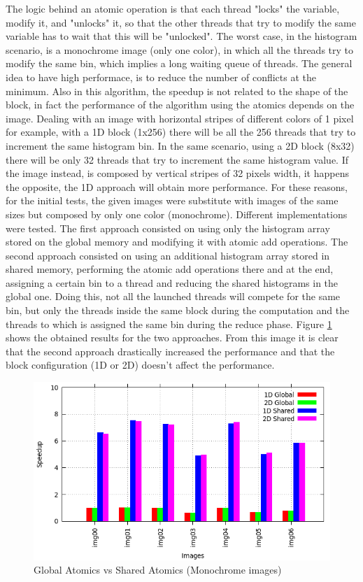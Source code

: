 \documentclass[a4paper]{article}
\begin{document}
The logic behind an atomic operation is that each thread "locks" the variable, modify it, and "unlocks" it, so that the other threads that try to modify the same variable has to wait that this will be "unlocked". The worst case, in the histogram scenario, is a monochrome image (only one color), in which all the threads try to modify the same bin, which implies a long waiting queue of threads. The general idea to have high performace, is to reduce the number of conflicts at the minimum. Also in this algorithm, the speedup is not related to the shape of the block, in fact the performance of the algorithm using the atomics depends on the image. Dealing with an image with horizontal stripes of different colors of 1 pixel for example, with a 1D block (1x256) there will be all the 256 threads that try to increment the same histogram bin. In the same scenario, using a 2D block (8x32) there will be only 32 threads that try to increment the same histogram value. If the image instead, is composed by vertical stripes of 32 pixels width, it happens the opposite, the 1D approach will obtain more performance. For these reasons, for the initial tests, the given images were substitute with images of the same sizes but composed by only one color (monochrome). Different implementations were tested. The first approach consisted on using only the histogram array stored on the global memory and modifying it with atomic add operations. The second approach consisted on using an additional histogram array stored in shared memory, performing the atomic add operations there and at the end, assigning a certain bin to a thread and reducing the shared histograms in the global one. Doing this, not all the launched threads will compete for the same bin, but only the threads inside the same block during the computation and the threads to which is assigned the same bin during the reduce phase. Figure \ref{fig:gavsa} shows the obtained results for the two approaches. From this image it is clear that the second approach drastically increased the performance and that the block configuration (1D or 2D) doesn't affect the performance.

\begin{figure}[!ht]
    \centering
    \includegraphics[width=0.7\linewidth]{res/new/histogram_confronto}
    \caption{Global Atomics vs Shared Atomics (Monochrome images)}
    \label{fig:gavsa}
\end{figure}
\FloatBarrier
\end{document}
